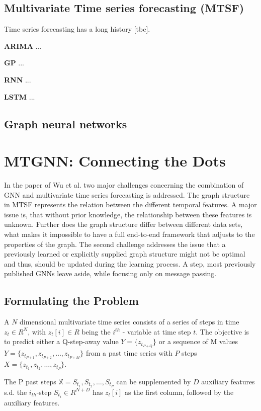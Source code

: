 \documentclass[letterpaper,twocolumn,12pt]{article}
\begin{document}
    \subsection{Multivariate Time series forecasting (MTSF)}
    Time series forecasting has a long history [tbc].

    \textbf{ARIMA} ...

    \textbf{GP} ...

    \textbf{RNN} ...

    \textbf{LSTM}  ...

    \subsection{Graph neural networks}


    \section{MTGNN: Connecting the Dots}
    In the paper of Wu et al. \cite{wu2020connecting} two major challenges concerning the combination of GNN and multivariate
    time series forecasting is addressed.
    The graph structure in MTSF represents the relation between the different temporal features.
    A major issue is, that without prior knowledge, the relationship between these features is unknown.
    Further does the graph structure differ between different data sets, what makes it impossible to have a full end-to-end framework that adjusts to the properties of the graph.
    The second challenge addresses the issue that a previously learned or explicitly supplied graph structure might not be optimal and thus,
    should be updated during the learning process.
    A step, most previously published GNNs leave aside, while focusing only on message passing.

    \subsection{Formulating the Problem}
    A $N$ dimensional multivariate time series consists of a series of steps in time $z_t \in R^N$, with $z_t[i] \in R$
    being the $i^{th}$ - variable at time step $t$. The objective is to predict either a Q-step-away value
    $Y = \{z_{t_{P+Q}}\}$ or a sequence of M values $Y = \{z_{t_{P+1}}, z_{t_{P+2}},\dots,z_{t_{P+M}}\}$
    from a past time series with $P$ steps $X = \{z_{t_{1}}, z_{t_{2}},\dots,z_{t_{P}}\}$.

    The P past steps  $\mathbb{X} = {S_{t_1}, S_{t_2}, \dots, S_{t_P}}$ can be supplemented by $D$ auxiliary features s.d. the $i_{th}$-step
    $S_{t_i} \in R^{N+D}$ has $z_t[i]$ as the first column, followed by the auxiliary features.
\end{document}
